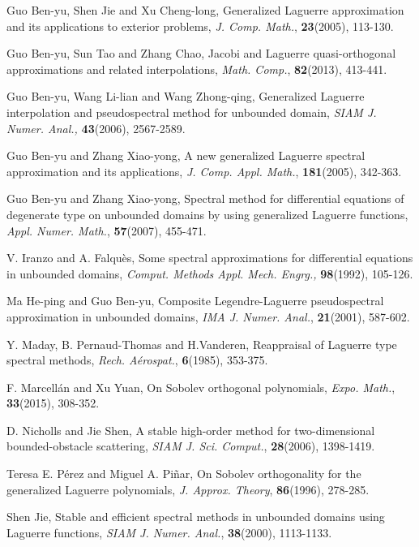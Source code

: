 \documentclass[10pt,reqno]{amsart}
\theoremstyle{remark}
\theoremstyle{definition}
\begin{document}
\begin{thebibliography}{99}
 Guo Ben-yu, Shen Jie and Xu Cheng-long,
Generalized Laguerre approximation and its applications to exterior
problems, {\it J. Comp. Math.}, {\bf 23}(2005), 113-130.

 Guo Ben-yu, Sun Tao and Zhang Chao, Jacobi and Laguerre quasi-orthogonal approximations and related interpolations, {\it Math. Comp.}, {\bf 82}(2013), 413-441.

 Guo Ben-yu, Wang Li-lian and Wang Zhong-qing,
Generalized Laguerre interpolation and pseudospectral method for
unbounded domain, {\it SIAM J. Numer. Anal.,} {\bf 43}(2006),
2567-2589.

Guo Ben-yu and Zhang Xiao-yong, A new generalized Laguerre spectral
approximation and its applications, {\it J. Comp. Appl. Math.}, {\bf
181}(2005), 342-363.

Guo Ben-yu and Zhang Xiao-yong, Spectral method for differential
  equations of degenerate type on unbounded domains by using
  generalized  Laguerre functions,
{\it  Appl. Numer. Math.}, {\bf 57}(2007), 455-471.

 V. Iranzo and A. Falqu\`{e}s, Some spectral
approximations for differential equations in unbounded domains, {\it
Comput. Methods Appl. Mech. Engrg.,} {\bf 98}(1992), 105-126.

Ma He-ping and Guo Ben-yu, Composite Legendre-Laguerre
pseudospectral approximation in unbounded domains, {\it IMA J.
Numer. Anal.}, {\bf 21}(2001), 587-602.

 Y. Maday, B. Pernaud-Thomas and H.Vanderen, Reappraisal of Laguerre type spectral methods,
{\it Rech. A\'{e}rospat.}, {\bf 6}(1985), 353-375.

  F. Marcell\'{a}n and Xu Yuan, On Sobolev orthogonal polynomials, {\it Expo. Math.}, {\bf 33}(2015), 308-352.

 D. Nicholls and Jie Shen,
A stable high-order method for two-dimensional bounded-obstacle scattering,
{\it SIAM J. Sci. Comput.}, {\bf 28}(2006), 1398-1419.

 Teresa E. P\'{e}rez and Miguel A. Pi\~{n}ar,
On Sobolev orthogonality for the generalized Laguerre polynomials,
{\it J. Approx. Theory},  {\bf 86}(1996),  278-285.

Shen Jie, Stable and efficient spectral methods in unbounded domains
using Laguerre functions, {\it SIAM J. Numer. Anal.}, {\bf
38}(2000), 1113-1133.


\end{thebibliography}
\end{document}

